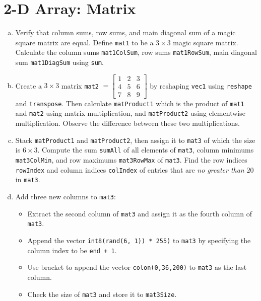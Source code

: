 \section{2-D Array: Matrix}
\begin{enumerate}[(a)]
  \item Verify that column sums, row sums, and main diagonal sum of a magic square matrix are equal. Define \verb|mat1| to be a $3 \times 3$ magic square matrix. Calculate the column sums \verb|mat1ColSum|, row sums \verb|mat1RowSum|, main diagonal sum \verb|mat1DiagSum| using \verb|sum|.
  \item Create a $3 \times 3$ matrix \verb|mat2| $= \begin{bmatrix} 1 & 2 & 3 \\ 4 & 5 & 6 \\ 7 & 8 & 9 \end{bmatrix}$ by reshaping \verb|vec1| using \verb|reshape| and \verb|transpose|. Then calculate \verb|matProduct1| which is the product of \verb|mat1| and \verb|mat2| using matrix multiplication, and \verb|matProduct2| using elementwise multiplication. Observe the difference between these two multiplications.
  \item Stack \verb|matProduct1| and \verb|matProduct2|, then assign it to \verb|mat3| of which the size is $6 \times 3$. Compute the sum \verb|sumAll| of all elements of \verb|mat3|, column minimums \verb|mat3ColMin|, and row maximums \verb|mat3RowMax| of \verb|mat3|. Find the row indices \verb|rowIndex| and column indices \verb|colIndex| of entries that are \emph{no greater than} $20$ in \verb|mat3|.
  \item Add three new columns to \verb|mat3|:
    \begin{itemize}
      \item Extract the second column of \verb|mat3| and assign it as the fourth column of \verb|mat3|.
      \item Append the vector \verb|int8(rand(6, 1)) * 255)| to \verb|mat3| by specifying the column index to be \verb|end + 1|.
      \item Use bracket to append the vector \verb|colon(0,36,200)| to \verb|mat3| as the last column.
      \item Check the size of \verb|mat3| and store it to \verb|mat3Size|.
    \end{itemize}
\end{enumerate}


